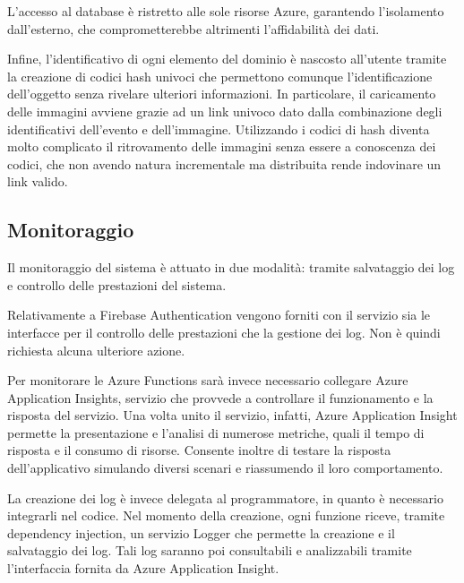 L’accesso al database è ristretto alle sole risorse Azure, garantendo l’isolamento dall’esterno, che comprometterebbe altrimenti l’affidabilità dei dati.

Infine, l’identificativo di ogni elemento del dominio è nascosto all’utente tramite la creazione di codici hash univoci che permettono comunque l’identificazione dell’oggetto senza rivelare ulteriori informazioni. In particolare, il caricamento delle immagini avviene grazie ad un link univoco dato dalla combinazione degli identificativi dell’evento e dell’immagine. Utilizzando i codici di hash diventa molto complicato il ritrovamento delle immagini senza essere a conoscenza dei codici, che non avendo natura incrementale ma distribuita rende indovinare un link valido.

\clearpage
\subsection{Monitoraggio}

Il monitoraggio del sistema è attuato in due modalità: tramite salvataggio dei log e controllo delle prestazioni del sistema.

Relativamente a Firebase Authentication vengono forniti con il servizio sia le interfacce
per il controllo delle prestazioni che la gestione dei log. Non è quindi richiesta alcuna ulteriore azione.

Per monitorare le Azure Functions sarà invece necessario collegare Azure Application Insights, servizio che provvede a controllare il funzionamento e la risposta del servizio. Una volta unito il servizio, infatti, Azure Application Insight permette la presentazione e l'analisi di numerose metriche, quali il tempo di risposta e il consumo di risorse. Consente inoltre di testare la risposta dell’applicativo simulando diversi scenari e riassumendo il loro comportamento.

La creazione dei log è invece delegata al programmatore, in quanto è necessario integrarli nel codice. Nel momento della creazione, ogni funzione riceve, tramite dependency injection, un servizio Logger che permette la creazione e il salvataggio dei log. Tali log saranno poi consultabili e analizzabili tramite l’interfaccia fornita da Azure Application Insight.

\clearpage